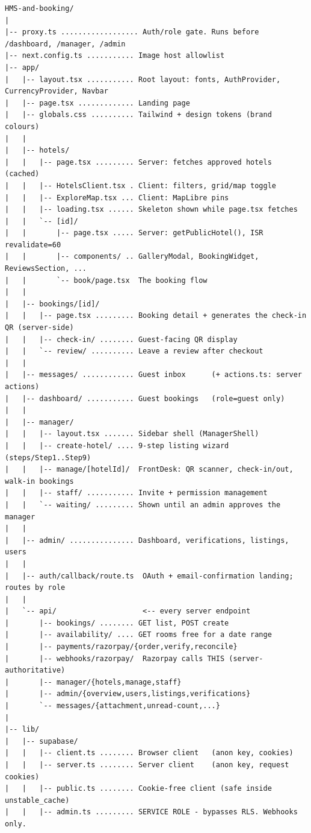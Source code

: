 \documentclass[11pt,a4paper]{article}
\begin{document}
\begin{lstlisting}
HMS-and-booking/
|
|-- proxy.ts .................. Auth/role gate. Runs before /dashboard, /manager, /admin
|-- next.config.ts ........... Image host allowlist
|-- app/
|   |-- layout.tsx ........... Root layout: fonts, AuthProvider, CurrencyProvider, Navbar
|   |-- page.tsx ............. Landing page
|   |-- globals.css .......... Tailwind + design tokens (brand colours)
|   |
|   |-- hotels/
|   |   |-- page.tsx ......... Server: fetches approved hotels (cached)
|   |   |-- HotelsClient.tsx . Client: filters, grid/map toggle
|   |   |-- ExploreMap.tsx ... Client: MapLibre pins
|   |   |-- loading.tsx ...... Skeleton shown while page.tsx fetches
|   |   `-- [id]/
|   |       |-- page.tsx ..... Server: getPublicHotel(), ISR revalidate=60
|   |       |-- components/ .. GalleryModal, BookingWidget, ReviewsSection, ...
|   |       `-- book/page.tsx  The booking flow
|   |
|   |-- bookings/[id]/
|   |   |-- page.tsx ......... Booking detail + generates the check-in QR (server-side)
|   |   |-- check-in/ ........ Guest-facing QR display
|   |   `-- review/ .......... Leave a review after checkout
|   |
|   |-- messages/ ............ Guest inbox      (+ actions.ts: server actions)
|   |-- dashboard/ ........... Guest bookings   (role=guest only)
|   |
|   |-- manager/
|   |   |-- layout.tsx ....... Sidebar shell (ManagerShell)
|   |   |-- create-hotel/ .... 9-step listing wizard (steps/Step1..Step9)
|   |   |-- manage/[hotelId]/  FrontDesk: QR scanner, check-in/out, walk-in bookings
|   |   |-- staff/ ........... Invite + permission management
|   |   `-- waiting/ ......... Shown until an admin approves the manager
|   |
|   |-- admin/ ............... Dashboard, verifications, listings, users
|   |
|   |-- auth/callback/route.ts  OAuth + email-confirmation landing; routes by role
|   |
|   `-- api/                    <-- every server endpoint
|       |-- bookings/ ........ GET list, POST create
|       |-- availability/ .... GET rooms free for a date range
|       |-- payments/razorpay/{order,verify,reconcile}
|       |-- webhooks/razorpay/  Razorpay calls THIS (server-authoritative)
|       |-- manager/{hotels,manage,staff}
|       |-- admin/{overview,users,listings,verifications}
|       `-- messages/{attachment,unread-count,...}
|
|-- lib/
|   |-- supabase/
|   |   |-- client.ts ........ Browser client   (anon key, cookies)
|   |   |-- server.ts ........ Server client    (anon key, request cookies)
|   |   |-- public.ts ........ Cookie-free client (safe inside unstable_cache)
|   |   |-- admin.ts ......... SERVICE ROLE - bypasses RLS. Webhooks only.

\end{lstlisting}
\end{document}

